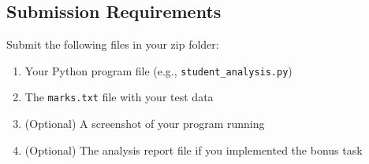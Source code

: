 \documentclass[a4paper,11pt]{article}
\theoremstyle{mytheor}
\begin{document}
\subsection*{Submission Requirements}

Submit the following files in your zip folder:

\begin{enumerate}
    \item Your Python program file (e.g., \texttt{student\_analysis.py})
    \item The \texttt{marks.txt} file with your test data
    \item (Optional) A screenshot of your program running
    \item (Optional) The analysis report file if you implemented the bonus task
\end{enumerate}
\end{document}
